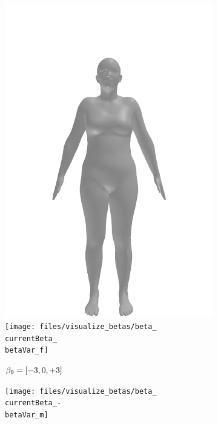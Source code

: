 \begin{figure}[h!]
\begin{subfigure}{\betaWidth}
        \includegraphics[width=\imgWidth]{files/visualize_betas/baseline_f}
        \texttt{[image: files/visualize\_betas/beta\_\\currentBeta\_\\betaVar\_f]}
        \caption{$\beta_9 = [-3, 0, +3]$}
    \end{subfigure}
    \begin{subfigure}{\betaWidth}
        \def\currentBeta{9}
        \centering
        \texttt{[image: files/visualize\_betas/beta\_\\currentBeta\_-\\betaVar\_m]}

\end{subfigure}
\end{figure}
